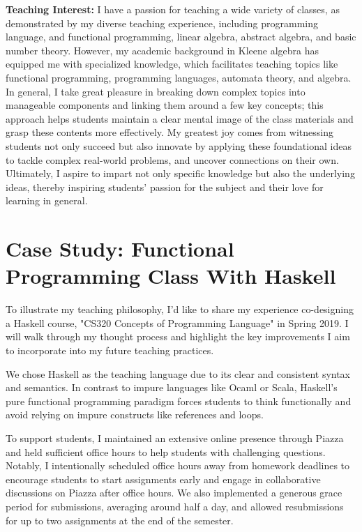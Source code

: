 \documentclass[11pt,a4paper,sans]{moderncv} %
\begin{document}
\textbf{Teaching Interest:}
I have a passion for teaching a wide variety of classes, as demonstrated by my diverse teaching experience, including programming language, and functional programming, linear algebra, abstract algebra, and basic number theory. 
However, my academic background in Kleene algebra has equipped me with specialized knowledge, which facilitates teaching topics like functional programming, programming languages, automata theory, and algebra. 
In general, I take great pleasure in breaking down complex topics into manageable components and linking them around a few key concepts; this approach helps students maintain a clear mental image of the class materials and grasp these contents more effectively. 
My greatest joy comes from witnessing students not only succeed but also innovate by applying these foundational ideas to tackle complex real-world problems, and uncover connections on their own.
Ultimately, I aspire to impart not only specific knowledge but also the underlying ideas, thereby inspiring students' passion for the subject and their love for learning in general.

\section{Case Study: Functional Programming Class With Haskell}

To illustrate my teaching philosophy, I'd like to share my experience co-designing a Haskell course, "CS320 Concepts of Programming Language" in Spring 2019.
I will walk through my thought process and highlight the key improvements I aim to incorporate into my future teaching practices.

We chose Haskell as the teaching language due to its clear and consistent syntax and semantics. 
In contrast to impure languages like Ocaml or Scala, Haskell's pure functional programming paradigm forces students to think functionally and avoid relying on impure constructs like references and loops.

To support students, I maintained an extensive online presence through Piazza and held sufficient office hours to help students with challenging questions. 
Notably, I intentionally scheduled office hours away from homework deadlines to encourage students to start assignments early and engage in collaborative discussions on Piazza after office hours.
We also implemented a generous grace period for submissions, averaging around half a day, and allowed resubmissions for up to two assignments at the end of the semester. 
\end{document}
